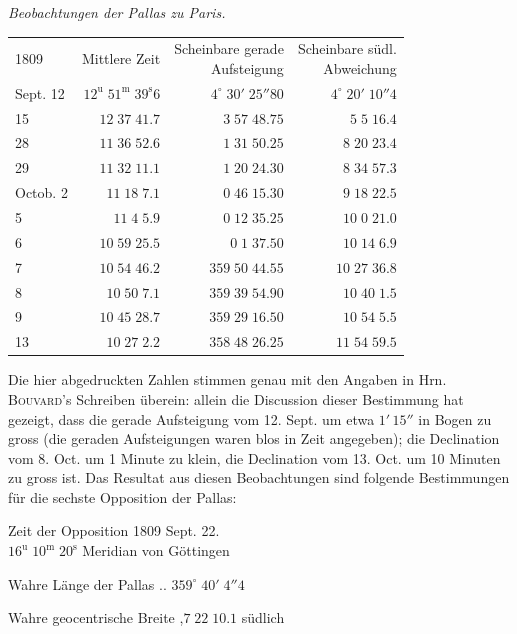 \begin{center}\emph{Beobachtungen der Pallas zu Paris.}\end{center}
\begin{center}\fontsize{9}{11}\selectfont\setlength{\tabcolsep}{5pt}\renewcommand{\arraystretch}{1.15}\begin{tabular}{lrrr}
1809 & Mittlere Zeit & \shortstack{Scheinbare gerade\\Aufsteigung} & \shortstack{Scheinbare südl.\\Abweichung}\\
Sept. 12 & $12^{\text{u}}\;51^{\text{m}}\;39^{\text{s}}6$ & $4^\circ\;30'\;25''80$ & $4^\circ\;20'\;10''4$\\
15 & $12\;37\;41.7$ & $3\;57\;48.75$ & $5\;5\;16.4$\\
28 & $11\;36\;52.6$ & $1\;31\;50.25$ & $8\;20\;23.4$\\
29 & $11\;32\;11.1$ & $1\;20\;24.30$ & $8\;34\;57.3$\\
Octob. 2 & $11\;18\;7.1$ & $0\;46\;15.30$ & $9\;18\;22.5$\\
5 & $11\;4\;5.9$ & $0\;12\;35.25$ & $10\;0\;21.0$\\
6 & $10\;59\;25.5$ & $0\;1\;37.50$ & $10\;14\;6.9$\\
7 & $10\;54\;46.2$ & $359\;50\;44.55$ & $10\;27\;36.8$\\
8 & $10\;50\;7.1$ & $359\;39\;54.90$ & $10\;40\;1.5$\\
9 & $10\;45\;28.7$ & $359\;29\;16.50$ & $10\;54\;5.5$\\
13 & $10\;27\;2.2$ & $358\;48\;26.25$ & $11\;54\;59.5$\\
\end{tabular}\end{center}

\par\indent Die hier abgedruckten Zahlen stimmen genau mit den Angaben in Hrn. \textsc{Bouvard}'s Schreiben überein: allein die Discussion dieser Bestimmung hat gezeigt, dass die gerade Aufsteigung vom 12. Sept. um etwa $1'\,15''$ in Bogen zu gross (die geraden Aufsteigungen waren blos in Zeit angegeben); die Declination vom 8. Oct. um 1 Minute zu klein, die Declination vom 13. Oct. um 10 Minuten zu gross ist. Das Resultat aus diesen Beobachtungen sind folgende Bestimmungen für die sechste Opposition der Pallas:

\begin{center}Zeit der Opposition 1809 Sept. 22.\\$16^{\text{u}}\;10^{\text{m}}\;20^{\text{s}}$ Meridian von Göttingen\par Wahre Länge der Pallas .\;.\; $359^\circ\;40'\;4''4$\par Wahre geocentrische Breite ,\quad $7\;22\;10.1$ südlich\end{center}

